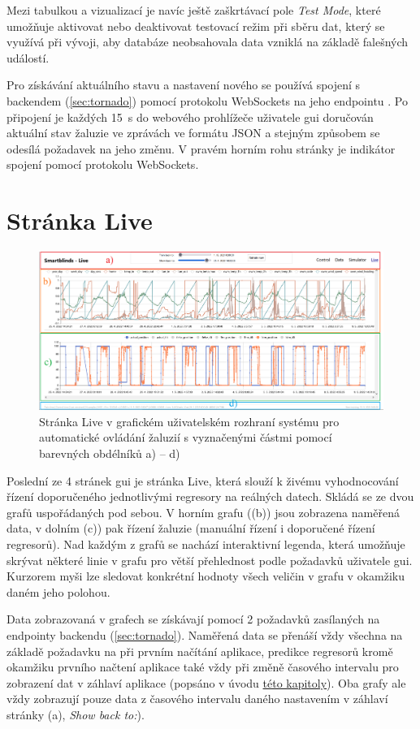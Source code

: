     Mezi tabulkou a vizualizací je navíc ještě zaškrtávací pole \emph{Test Mode}, které umožňuje aktivovat nebo deaktivovat testovací režim při sběru dat, který se využívá při vývoji, aby databáze neobsahovala data vzniklá na základě falešných událostí.

    Pro získávání aktuálního stavu a nastavení nového se používá spojení s backendem (\cref{sec:tornado}) pomocí protokolu WebSockets na jeho endpointu . Po připojení je každých 15~{s} do webového prohlížeče uživatele \acrshort{gui} doručován aktuální stav žaluzie ve zprávách ve formátu JSON a stejným způsobem se odesílá požadavek na jeho změnu. V pravém horním rohu stránky je indikátor spojení pomocí protokolu WebSockets.
\section{Stránka Live} \label{sec:live}
    \begin{figure}[h]
        \centering
        \includegraphics[draft=false,width=\textwidth]{img/gui/Live.png}
        \caption[Stránka Live v GUI]{Stránka Live v grafickém uživatelském rozhraní systému pro automatické ovládání žaluzií s vyznačenými částmi pomocí barevných obdélníků \textcolor{guired}{a)} -- \textcolor{guiblue}{d)}}
        \label{fig:live}
    \end{figure}
    Poslední ze 4 stránek \acrshort{gui} je stránka Live, která slouží k živému vyhodnocování řízení doporučeného jednotlivými regresory na reálných datech. Skládá se ze dvou grafů uspořádaných pod sebou. V horním grafu ((\textcolor{guiorange}{b)}) jsou zobrazena naměřená data, v dolním (\textcolor{guigreen}{c)}) pak řízení žaluzie (manuální řízení i doporučené řízení regresorů). Nad každým z grafů se nachází interaktivní legenda, která umožňuje skrývat některé linie v grafu pro větší přehlednost podle požadavků uživatele \acrshort{gui}. Kurzorem myši lze sledovat konkrétní hodnoty všech veličin v grafu v okamžiku daném jeho polohou.

    Data zobrazovaná v grafech se získávají pomocí 2 požadavků zasílaných na endpointy backendu (\cref{sec:tornado}). Naměřená data se přenáší vždy všechna na základě požadavku na  při prvním načítání aplikace, predikce regresorů kromě okamžiku prvního načtení aplikace také vždy při změně časového intervalu pro zobrazení dat v záhlaví aplikace (popsáno v úvodu \hyperref[chap:gui]{této kapitoly}). Oba grafy ale vždy zobrazují pouze data z časového intervalu daného nastavením v záhlaví stránky (\textcolor{guired}{a)}, \emph{Show back to:}).